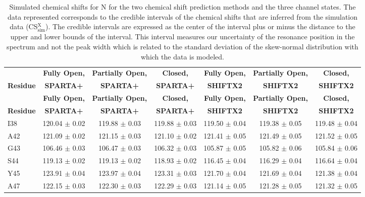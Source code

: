 \documentclass[%
 aip,
 amsmath,amssymb,
 preprint,%
]{revtex4-1}
\begin{document}
\begingroup
\begin{center}
\begin{longtable}{l|c|c|c|c|c|c}
\caption{\scriptsize Simulated chemical shifts for N for the two chemical shift prediction methods and the three channel states. The data represented corresponds to the credible intervals of the chemical shifts that are inferred from the simulation data (CS$_\text{sim}^\text{X}$). The credible intervals are expressed as the center of the interval plus or minus the distance to the upper and lower bounds of the interval. This interval measures our uncertainty of the resonance position in the spectrum and not the peak width which is related to the standard deviation of the skew-normal distribution with which the data is modeled. \label{SI_tb_CSsim_N}}\\ 
\hline 
\hline 
& \textbf{Fully Open,} & \textbf{Partially Open,} & \textbf{Closed,} & \textbf{Fully Open,} & \textbf{Partially Open,} & \textbf{Closed,}  \\
\textbf{Residue} & \textbf{SPARTA+} & \textbf{SPARTA+} & \textbf{SPARTA+} & \textbf{SHIFTX2} & \textbf{SHIFTX2} & \textbf{SHIFTX2}  \\
\hline
\endfirsthead 
\hline
& \textbf{Fully Open,} & \textbf{Partially Open,} & \textbf{Closed,} & \textbf{Fully Open,} & \textbf{Partially Open,} & \textbf{Closed,}  \\
\textbf{Residue} & \textbf{SPARTA+} & \textbf{SPARTA+} & \textbf{SPARTA+} & \textbf{SHIFTX2} & \textbf{SHIFTX2} & \textbf{SHIFTX2}  \\ \hline
\endhead
I38 & 120.04 $\pm$ 0.02 & 119.88 $\pm$ 0.03 & 119.88 $\pm$ 0.03 & 119.50 $\pm$ 0.04 & 119.38 $\pm$ 0.05 & 119.48 $\pm$ 0.04 \\
A42 & 121.09 $\pm$ 0.02 & 121.15 $\pm$ 0.03 & 121.10 $\pm$ 0.02 & 121.41 $\pm$ 0.05 & 121.49 $\pm$ 0.05 & 121.52 $\pm$ 0.05 \\
G43 & 106.46 $\pm$ 0.03 & 106.47 $\pm$ 0.03 & 106.32 $\pm$ 0.03 & 105.87 $\pm$ 0.05 & 105.82 $\pm$ 0.06 & 105.84 $\pm$ 0.06 \\
S44 & 119.13 $\pm$ 0.02 & 119.13 $\pm$ 0.02 & 118.93 $\pm$ 0.02 & 116.45 $\pm$ 0.04 & 116.29 $\pm$ 0.04 & 116.64 $\pm$ 0.04 \\
Y45 & 123.91 $\pm$ 0.04 & 123.97 $\pm$ 0.04 & 123.31 $\pm$ 0.03 & 121.70 $\pm$ 0.04 & 121.69 $\pm$ 0.04 & 121.38 $\pm$ 0.04 \\
A47 & 122.15 $\pm$ 0.03 & 122.30 $\pm$ 0.03 & 122.29 $\pm$ 0.03 & 121.14 $\pm$ 0.05 & 121.28 $\pm$ 0.05 & 121.32 $\pm$ 0.05 \\

\end{longtable}
\end{center}
\end{document}
